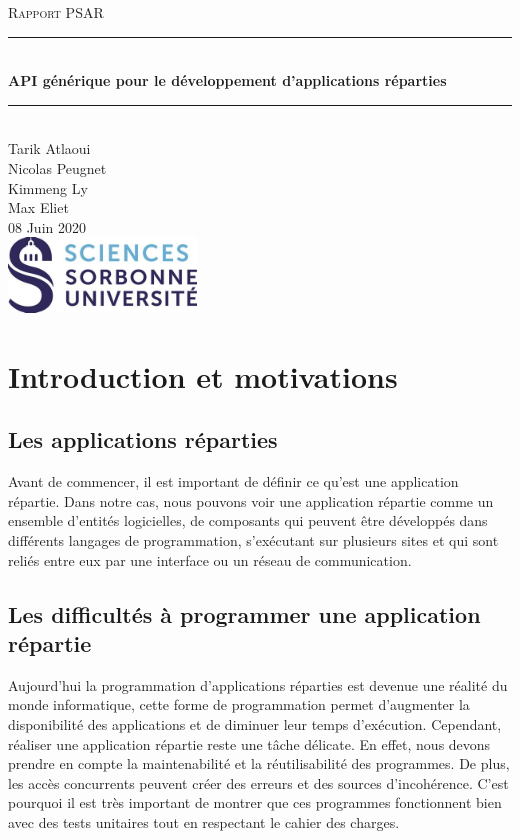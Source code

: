 \documentclass{article}
\date{\today}
\author{Tarik Atlaoui \\ Nicolas Peugnet \\ Kimmeng Ly \\ Max Eliet}
\begin{document}
\begin{titlepage}
	\enlargethispage{2cm}
	\newcommand{\HRule}{\rule{\linewidth}{0.5mm}}
	\center
	\textsc{\LARGE
	Rapport PSAR 
	} \\[1cm]
	\HRule \\[0.4cm]
	{ \huge \bfseries API générique pour le développement d'applications réparties \\[0.15cm] }
	\HRule \\[4cm]
	\large{Tarik Atlaoui \\[3mm] Nicolas Peugnet \\[3mm] Kimmeng Ly \\[3mm] Max Eliet} \\[3cm]
	08 Juin 2020 \\[3cm]
	\hfill \includegraphics[width=5cm]{logoSU.jpg}
\end{titlepage}

	\newpage
	\tableofcontents
	\newpage


		\section{Introduction et motivations}

			\subsection{Les applications réparties}
			Avant de commencer, il est important de définir ce qu’est une application répartie. Dans notre cas, nous pouvons voir une application répartie comme un ensemble d’entités logicielles, de composants qui peuvent être développés dans différents langages de programmation, s’exécutant sur plusieurs sites et qui sont reliés entre eux par une interface ou un réseau de communication.

			\subsection{Les difficultés à programmer une application répartie}
			 Aujourd’hui la programmation d’applications réparties est devenue une réalité du monde informatique, cette forme de programmation permet d'augmenter la disponibilité des applications et de diminuer leur temps d'exécution. Cependant, réaliser une application répartie reste une tâche délicate. En effet, nous devons prendre en compte la maintenabilité et la réutilisabilité des programmes. De plus, les accès concurrents peuvent créer des erreurs et des sources d'incohérence. C’est pourquoi il est très important de montrer que ces programmes fonctionnent bien avec des tests unitaires tout en respectant le cahier des charges.
\end{document}

